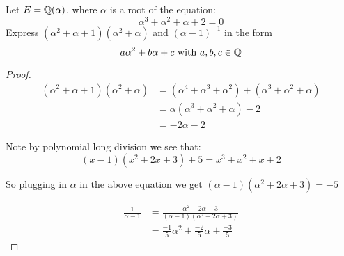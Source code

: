 

\begin{exercise}
Let $E = \mathbb{Q}(\alpha)$, where $\alpha$ is a root of the equation:\begin{equation*}
    \alpha^3+\alpha^2+\alpha+2 = 0
\end{equation*}
Express $(\alpha^2+\alpha+1)(\alpha^2+\alpha)$ and $(\alpha-1)^{-1}$ in the form \begin{equation*}
    a\alpha^2+b\alpha+c \text{ with }a,b,c\in\mathbb{Q}
\end{equation*}
\begin{proof}
    \begin{align}
        (\alpha^2+\alpha+1)(\alpha^2+\alpha) &= (\alpha^4+\alpha^3+\alpha^2) + (\alpha^3+\alpha^2+\alpha)\\
        &= \alpha(\alpha^3+\alpha^2+\alpha) -2\\
        &= -2\alpha -2
    \end{align}
    
    Note by polynomial long division we see that:\begin{equation}
        (x - 1)(x^2+2x+3) + 5 = x^3+x^2+x+2
    \end{equation}
    
    So plugging in $\alpha$ in the above equation we get $(\alpha - 1)(\alpha^2+2\alpha+3) = -5$
    
    \begin{align}
        \frac{1}{\alpha-1}&= \frac{\alpha^2+2\alpha+3}{(\alpha-1)(\alpha^2+2\alpha+3)}\\
        &= \frac{-1}{5}\alpha^2+\frac{-2}{5}\alpha+\frac{-3}{5}
    \end{align}
\end{proof}
\end{exercise}

